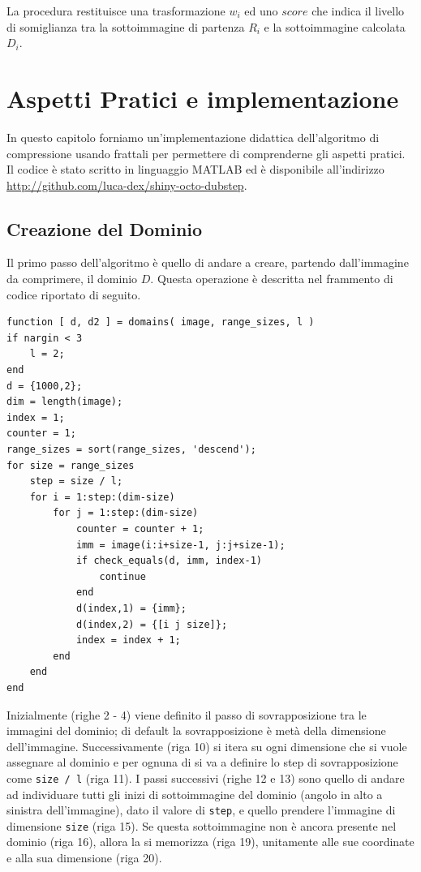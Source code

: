 \documentclass[11pt,a4paper,appendixprefix=true,numbers=noenddot]{scrreprt}
\begin{document}
La procedura  restituisce una trasformazione $w_i$ ed uno $score$ che indica il livello di somiglianza tra la sottoimmagine di partenza $R_i$ e la sottoimmagine calcolata $D_i$.

\chapter{Aspetti Pratici e implementazione}

In questo capitolo forniamo un'implementazione didattica dell'algoritmo di compressione usando frattali per permettere di comprenderne gli aspetti pratici. Il codice è stato scritto in linguaggio MATLAB ed è disponibile all'indirizzo \url{http://github.com/luca-dex/shiny-octo-dubstep}.

\section{Creazione del Dominio}

Il primo passo dell'algoritmo è quello di andare a creare, partendo dall'immagine da comprimere, il dominio $D$. Questa operazione è descritta nel frammento di codice riportato di seguito.

\begin{verbatim}
function [ d, d2 ] = domains( image, range_sizes, l )
if nargin < 3
    l = 2;
end
d = {1000,2};
dim = length(image);
index = 1;
counter = 1;
range_sizes = sort(range_sizes, 'descend');
for size = range_sizes
    step = size / l;
    for i = 1:step:(dim-size)
        for j = 1:step:(dim-size)
            counter = counter + 1;
            imm = image(i:i+size-1, j:j+size-1);
            if check_equals(d, imm, index-1)
                continue
            end
            d(index,1) = {imm};
            d(index,2) = {[i j size]};
            index = index + 1;
        end
    end
end
\end{verbatim}

Inizialmente (righe 2 - 4) viene definito il passo di sovrapposizione tra le immagini del dominio; di default la sovrapposizione è metà della dimensione dell'immagine. Successivamente (riga 10) si itera su ogni dimensione che si vuole assegnare al dominio e per ognuna di si va a definire lo step di sovrapposizione come \texttt{size / l} (riga 11). I passi successivi (righe 12 e 13) sono quello di andare ad individuare tutti gli inizi di sottoimmagine del dominio (angolo in alto a sinistra dell'immagine), dato il valore di \texttt{step}, e quello prendere l'immagine di dimensione \texttt{size} (riga 15). Se questa sottoimmagine non è ancora presente nel dominio (riga 16), allora la si memorizza (riga 19), unitamente alle sue coordinate e alla sua dimensione (riga 20).
\end{document}
